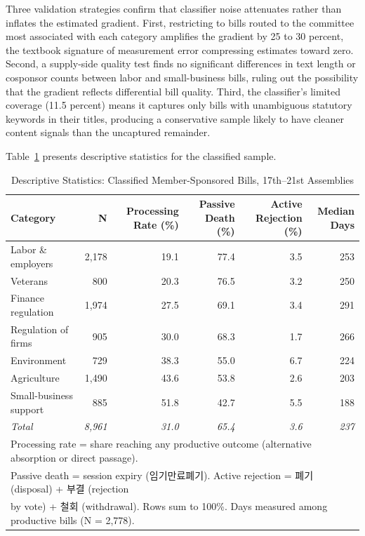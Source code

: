 \documentclass[11pt]{article}
\begin{document}
Three validation strategies confirm that classifier noise attenuates rather than inflates the estimated gradient. First, restricting to bills routed to the committee most associated with each category amplifies the gradient by 25 to 30 percent, the textbook signature of measurement error compressing estimates toward zero. Second, a supply-side quality test finds no significant differences in text length or cosponsor counts between labor and small-business bills, ruling out the possibility that the gradient reflects differential bill quality. Third, the classifier's limited coverage (11.5 percent) means it captures only bills with unambiguous statutory keywords in their titles, producing a conservative sample likely to have cleaner content signals than the uncaptured remainder.

Table~\ref{tab:desc} presents descriptive statistics for the classified sample.

\begin{table}[htbp]
\centering
\caption{Descriptive Statistics: Classified Member-Sponsored Bills, 17th--21st Assemblies}
\label{tab:desc}
\begin{tabular}{lrrrrr}
\toprule
Category & N & Processing Rate (\%) & Passive Death (\%) & Active Rejection (\%) & Median Days \\
\midrule
Labor \& employers      & 2,178 & 19.1 & 77.4 & 3.5 & 253 \\
Veterans                 &   800 & 20.3 & 76.5 & 3.2 & 250 \\
Finance regulation       & 1,974 & 27.5 & 69.1 & 3.4 & 291 \\
Regulation of firms      &   905 & 30.0 & 68.3 & 1.7 & 266 \\
Environment              &   729 & 38.3 & 55.0 & 6.7 & 224 \\
Agriculture              & 1,490 & 43.6 & 53.8 & 2.6 & 203 \\
Small-business support   &   885 & 51.8 & 42.7 & 5.5 & 188 \\
\midrule
\textit{Total}           & \textit{8,961} & \textit{31.0} & \textit{65.4} & \textit{3.6} & \textit{237} \\
\bottomrule
\multicolumn{6}{l}{\footnotesize Processing rate = share reaching any productive outcome (alternative absorption or direct passage).} \\
\multicolumn{6}{l}{\footnotesize Passive death = session expiry (임기만료폐기). Active rejection = 폐기 (disposal) + 부결 (rejection} \\
\multicolumn{6}{l}{\footnotesize by vote) + 철회 (withdrawal). Rows sum to 100\%. Days measured among productive bills (N = 2,778).} \\
\end{tabular}
\end{table}
\end{document}
